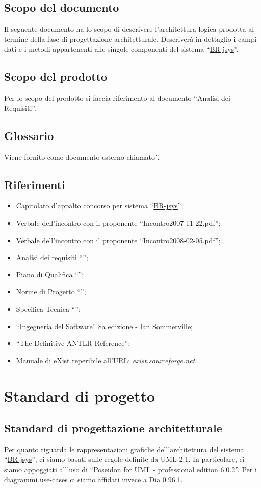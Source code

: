 \section{Scopo del documento}
Il seguente documento ha lo scopo di descrivere l'architettura logica prodotta al termine della fase di progettazione architetturale. Descriver\`a in dettaglio i campi dati e i metodi appartenenti alle singole componenti del sistema ``\underline{BR-jsys}''.
\section{Scopo del prodotto}
Per lo scopo del prodotto si faccia riferimento al documento ``Analisi dei Requisiti''.

\section{Glossario}
Viene fornito come documento esterno chiamato \G.

\section{Riferimenti}
\begin{itemize}
\item Capitolato d'appalto concorso per sistema ``\underline{BR-jsys}'';
\item Verbale dell'incontro con il proponente ``Incontro2007-11-22.pdf'';
\item Verbale dell'incontro con il proponente ``Incontro2008-02-05.pdf'';
\item Analisi dei requisiti ``\AR'';
\item Piano di Qualifica ``\PdQ'';
\item Norme di Progetto ``\NdP'';
\item Specifica Tecnica ``\ST'';
\item ``Ingegneria del Software'' 8a edizione - Ian Sommerville;
\item ``The Definitive ANTLR Reference'';
\item Manuale di eXist reperibile all'URL: \textit{exist.sourceforge.net}.
\end{itemize}
\chapter{Standard di progetto}
\section{Standard di progettazione architetturale}
Per quanto riguarda le rappresentazioni grafiche dell'architettura del sistema ``\underline{BR-jsys}'', ci siamo basati sulle regole definite da UML 2.1. In particolare, ci siamo appoggiati all'uso di ``Poseidon for UML - professional edition 6.0.2''. Per i diagrammi use-cases ci siamo affidati invece a Dia 0.96.1.
